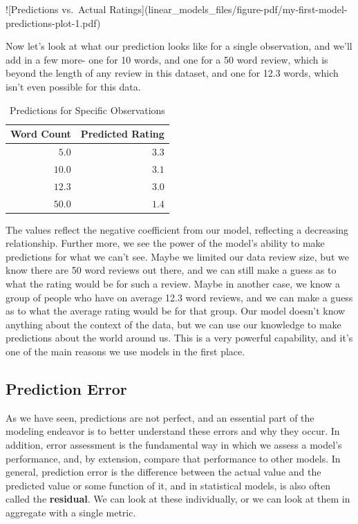 \documentclass[
  letterpaper,
]{krantz}
\begin{document}
!{[}Predictions vs.~Actual
Ratings{]}(linear\_models\_files/figure-pdf/my-first-model-predictions-plot-1.pdf)

Now let's look at what our prediction looks like for a single
observation, and we'll add in a few more- one for 10 words, and one for
a 50 word review, which is beyond the length of any review in this
dataset, and one for 12.3 words, which isn't even possible for this
data.

\hypertarget{tbl-predictions}{}
\begin{longtable}{rr}
\caption{\label{tbl-predictions}Predictions for Specific Observations }\tabularnewline

\toprule
Word Count & Predicted Rating \\ 
\midrule\addlinespace[2.5pt]
\textcolor[HTML]{404040}{$5.0$} & \textcolor[HTML]{404040}{$3.3$} \\ 
\textcolor[HTML]{404040}{$10.0$} & \textcolor[HTML]{404040}{$3.1$} \\ 
\textcolor[HTML]{404040}{$12.3$} & \textcolor[HTML]{404040}{$3.0$} \\ 
\textcolor[HTML]{404040}{$50.0$} & \textcolor[HTML]{404040}{$1.4$} \\ 
\bottomrule
\end{longtable}

The values reflect the negative coefficient from our model, reflecting a
decreasing relationship. Further more, we see the power of the model's
ability to make predictions for what we can't see. Maybe we limited our
data review size, but we know there are 50 word reviews out there, and
we can still make a guess as to what the rating would be for such a
review. Maybe in another case, we know a group of people who have on
average 12.3 word reviews, and we can make a guess as to what the
average rating would be for that group. Our model doesn't know anything
about the context of the data, but we can use our knowledge to make
predictions about the world around us. This is a very powerful
capability, and it's one of the main reasons we use models in the first
place.

\subsection{Prediction Error}\label{prediction-error}

As we have seen, predictions are not perfect, and an essential part of
the modeling endeavor is to better understand these errors and why they
occur. In addition, error assessment is the fundamental way in which we
assess a model's performance, and, by extension, compare that
performance to other models. In general, prediction error is the
difference between the actual value and the predicted value or some
function of it, and in statistical models, is also often called the
\textbf{residual}. We can look at these individually, or we can look at
them in aggregate with a single metric.
\end{document}
